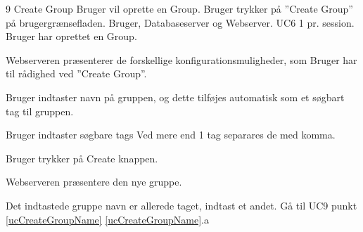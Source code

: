 
\uchead
	{9}
	{Create Group}
	{Bruger vil oprette en Group.}
	{Bruger trykker på ''Create Group'' på brugergrænsefladen.}
	{Bruger, Databaseserver og Webserver.}
	{UC6}
	{1 pr. session.}
	{Bruger har oprettet en Group.}

\item Webserveren præsenterer de forskellige konfigurationsmuligheder, som Bruger har til rådighed ved ''Create Group''.

\item \label{ucCreateGroupName} Bruger indtaster navn på gruppen, og dette tilføjes automatisk som et søgbart tag til gruppen.

\item Bruger indtaster søgbare tags Ved mere end 1 tag separares de med komma.

\item Bruger trykker på Create knappen.

\item Webserveren præsentere den nye gruppe.

\ucdescriptionend

\ucextension
	{Det indtastede gruppe navn er allerede taget, indtast et andet.}
	{Gå til UC9 punkt \ref{ucCreateGroupName}}
	{\ref{ucCreateGroupName}.a}
		
